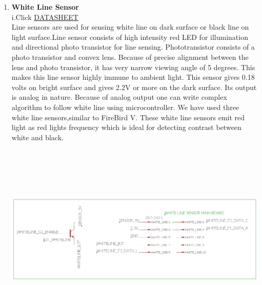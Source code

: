 \documentclass[a4paper,12pt,oneside]{book}
\begin{document}
\begin{enumerate}
    
    \newpage\item \textbf{White Line Sensor}\\
    i.Click \href{http://extremeelectronics.co.in/datasheets/IR333C_datasheet.pdf}{DATASHEET}
    \\[0.5cm]Line sensors are used for sensing white line on dark surface or black line on light surface.Line sensor consists of high intensity red LED for illumination and directional photo transistor for line sensing. Phototransistor consists of a photo transistor and convex lens. Because of precise alignment between the lens and photo transistor, it has very narrow viewing angle of 5 degrees. This makes this line sensor highly immune to ambient light. This sensor gives 0.18 volts on bright surface and gives 2.2V or more on the dark surface. Its output is analog in nature. Because of analog output one can write complex algorithm to follow white line using microcontroller.
    We have used three white line sensors,similar to FireBird V. These white line sensors emit red light as red lights frequency which is ideal for detecting contrast between white and black.
    \vspace*{.5cm}
    \\\hfill\includegraphics[width=13cm, height=10cm]{Whiteline}
    

\end{enumerate}
\end{document}
